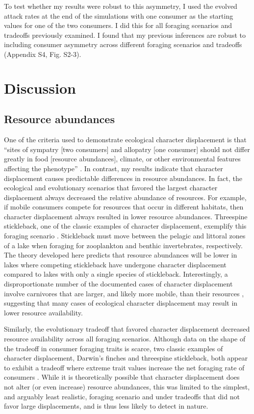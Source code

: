 \documentclass[11pt,]{article}
\begin{document}
To test whether my results were robust to this asymmetry, I used the
evolved attack rates at the end of the simulations with one consumer as
the starting values for one of the two consumers. I did this for all
foraging scenarios and tradeoffs previously examined. I found that my
previous inferences are robust to including consumer asymmetry across
different foraging scenarios and tradeoffs (Appendix S4, Fig. S2-3).

\section{Discussion}\label{discussion}

\subsection{Resource abundances}\label{resource-abundances}

One of the criteria used to demonstrate ecological character
displacement is that ``sites of sympatry {[}two consumers{]} and
allopatry {[}one consumer{]} should not differ greatly in food
\(\textbf{[}\)resource abundances\(\textbf{]}\), climate, or other
environmental features affecting the phenotype'' \citep{Schluter1992}.
In contrast, my results indicate that character displacement causes
predictable differences in resource abundances. In fact, the ecological
and evolutionary scenarios that favored the largest character
displacement always decreased the relative abundance of resources. For
example, if mobile consumers compete for resources that occur in
different habitats, then character displacement always resulted in lower
resource abundances. Threespine stickleback, one of the classic examples
of character displacement, exemplify this foraging scenario
\citep{Schluter1992, Schluter2000}. Stickleback must move between the
pelagic and littoral zones of a lake when foraging for zooplankton and
benthic invertebrates, respectively. The theory developed here predicts
that resource abundances will be lower in lakes where competing
stickleback have undergone character displacement compared to lakes with
only a single species of stickleback. Interestingly, a disproportionate
number of the documented cases of character displacement involve
carnivores \citep{Schluter2000} that are larger, and likely more mobile,
than their resources \citep{McCann2005}, suggesting that many cases of
ecological character displacement may result in lower resource
availability.

Similarly, the evolutionary tradeoff that favored character displacement
decreased resource availability across all foraging scenarios. Although
data on the shape of the tradeoff in consumer foraging traits is scarce,
two classic examples of character displacement, Darwin's finches and
threespine stickleback, both appear to exhibit a tradeoff where extreme
trait values increase the net foraging rate of consumers
\citep{Schluter1985, Arnegard2014}. While it is theoretically possible
that character displacement does not alter (or even increase) resource
abundances, this was limited to the simplest, and arguably least
realistic, foraging scenario and under tradeoffs that did not favor
large displacements, and is thus less likely to detect in nature.
\end{document}
